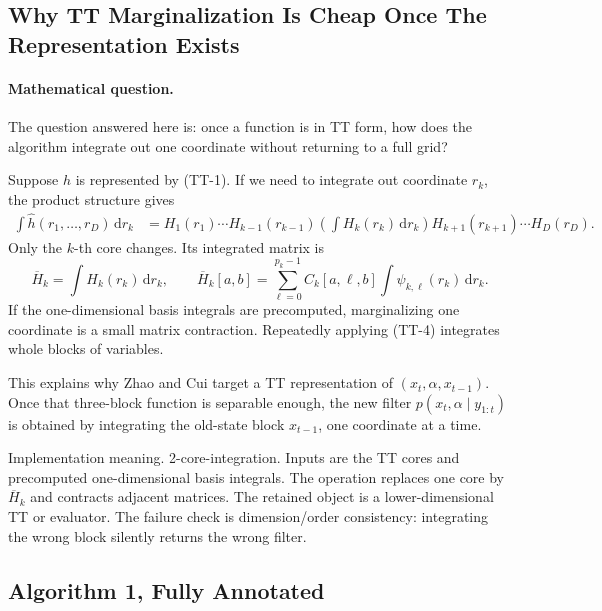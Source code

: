\documentclass[11pt]{article}
\numberwithin{equation}{section}
\newcommand{\dd}{\,\mathrm d}
\begin{document}
\subsection{Why TT Marginalization Is Cheap Once The Representation Exists}

\paragraph{Mathematical question.}
The question answered here is: once a function is in TT form, how does the
algorithm integrate out one coordinate without returning to a full grid?

Suppose \(h\) is represented by (TT-1).  If we need to integrate out coordinate
\(r_k\), the product structure gives
\begin{equation}
\begin{aligned}
 \int \widehat h(r_1,\ldots,r_D)\dd r_k
 &=
 H_1(r_1)\cdots H_{k-1}(r_{k-1})
 \left(\int H_k(r_k)\dd r_k\right)
 H_{k+1}(r_{k+1})\cdots H_D(r_D).
\end{aligned}
\label{eq:p24-tt-4}
\end{equation}
Only the \(k\)-th core changes.  Its integrated matrix is
\begin{equation}
    \overline H_k
    =
    \int H_k(r_k)\dd r_k,\qquad
    \overline H_k[a,b]
    =
    \sum_{\ell=0}^{p_k-1} C_k[a,\ell,b]
    \int \psi_{k,\ell}(r_k)\dd r_k.
    \label{eq:p24-tt-5}
\end{equation}
If the one-dimensional basis integrals are precomputed, marginalizing one
coordinate is a small matrix contraction.  Repeatedly applying (TT-4) integrates
whole blocks of variables.

This explains why Zhao and Cui \cite{zhao2024ttsequential} target a TT representation of
\((x_t,\alpha,x_{t-1})\).  Once that three-block function is separable enough,
the new filter \(p(x_t,\alpha\mid y_{1:t})\) is obtained by integrating the
old-state block \(x_{t-1}\), one coordinate at a time.

Implementation meaning. 2-core-integration.  Inputs are the TT cores and
precomputed one-dimensional basis integrals.  The operation replaces one core
by \(\overline H_k\) and contracts adjacent matrices.  The retained object is a
lower-dimensional TT or evaluator.  The failure check is dimension/order
consistency: integrating the wrong block silently returns the wrong filter.

\subsection{Algorithm 1, Fully Annotated}
\end{document}
